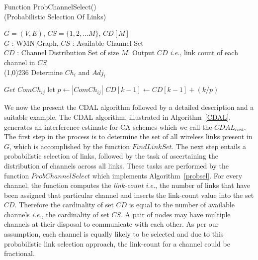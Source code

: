 \documentclass[conference]{IEEEtran}
\begin{document}
\renewcommand{\algorithmicrequire}{\textbf{Input:}}
\renewcommand{\algorithmicensure}{\textbf{Output:}}
\begin{algorithm}[htb!] 
\caption{Function ProbChannelSelect()\\ (Probabilistic Selection Of Links)}
\label{probsel}
\begin{algorithmic}[1]
{\fontsize{9}{10}
\REQUIRE$G = (V,E)$, $CS =\{1, 2,...M\}$, $CD[M]$ \\
 $G$ : WMN Graph, $CS$ : Available Channel Set\\
 $CD$ : Channel Distribution Set of size $M$. 
\ENSURE Output $CD$ \emph{i.e.}, link count of each channel in $CS$ \\
\line(1,0){236}
\STATE Determine $Ch_i$ and $Adj_i$ 
\ENDFOR

\STATE $Get$ $ComCh_{ij}$ 
\STATE let $p \leftarrow |ComCh_{ij}| $
\STATE $CD[k-1] \leftarrow CD[k-1]+(k/p)$
\ENDFOR
\ENDFOR
\ENDFOR
}
\end{algorithmic}
\end{algorithm}




We now the present the CDAL algorithm followed by a detailed description and a suitable example. The CDAL algorithm, illustrated in Algorithm~\ref{CDAL}, generates an interference estimate for CA schemes which we call the $CDAL_{cost}$. The first step in the process is to determine the set of all wireless links present in $G$, which is accomplished by the function $FindLinkSet$. The next step entails a probabilistic selection of links, followed by the task of ascertaining the distribution of channels across all links. These tasks are performed by the function $ProbChannelSelect$ which implements Algorithm~\ref{probsel}. For every channel, the function computes the \textit{link-count} \textit{i.e.}, the number of links that have been assigned that particular channel and inserts the link-count value into the set $CD$. Therefore the cardinality of set $CD$ is equal to the number of available channels \emph{i.e.}, the cardinality of set $CS$. A pair of nodes may have multiple channels at their disposal to 
communicate with each other. As per our assumption, each channel is equally likely to be selected and due to this probabilistic link selection approach, the link-count for a channel could be fractional.
\end{document}
